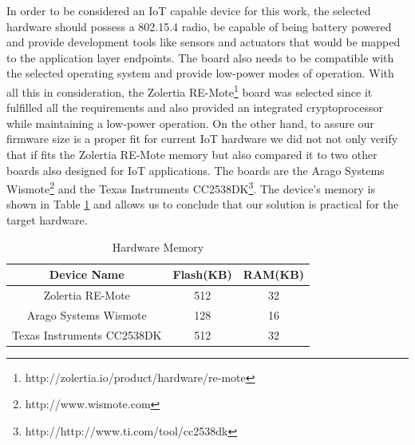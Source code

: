 \documentclass{sig-alternate-05-2015}
\newcommand{\legend}[2][]{
    \begin{scope}[#1]
    \path
        \foreach \n/\s in {#2}
            {
                  ++(0,-10pt) node[\s,legend box] {} +(5pt,0) node[legend label] {\n}
            }
    ;
    \end{scope}
}
\begin{document}

In order to be considered an \gls{IoT} capable device for this work, the selected hardware should possess a 802.15.4 radio, be capable of being battery powered and provide development tools like sensors and actuators that would be mapped to the application layer endpoints. 
The board also needs to be compatible with the selected operating system and provide low-power modes of operation. 
With all this in consideration, the Zolertia RE-Mote\footnote{http://zolertia.io/product/hardware/re-mote} board was selected since it fulfilled all the requirements and also provided an integrated cryptoprocessor while maintaining a low-power operation.
On the other hand, to assure our firmware size is a proper fit for current \gls{IoT} hardware we did not not only verify that if fits the Zolertia RE-Mote memory but also compared it to two other boards also designed for \gls{IoT} applications. 
The boards are the Arago Systems Wismote\footnote{http://www.wismote.com} and the Texas Instruments CC2538DK\footnote{http://http://www.ti.com/tool/cc2538dk}. 
The device's memory is shown in Table \ref{tab:hardware_memory} and allows us to conclude that our solution is practical for the target hardware.

\begin{table}
\centering
\caption{Hardware Memory}
\label{tab:hardware_memory}
\begin{tabular}{|c|c|c|} \hline
Device Name&Flash(KB)&RAM(KB)\\ \hline
Zolertia RE-Mote& 512& 32\\ \hline
Arago Systems Wismote& 128& 16\\ \hline
Texas Instruments CC2538DK& 512 & 32\\
\hline\end{tabular}
\end{table}
\end{document}
